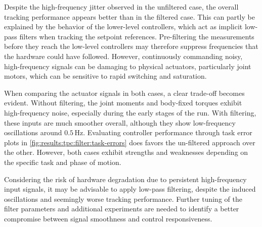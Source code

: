 Despite the high-frequency jitter observed in the unfiltered case, the overall tracking performance appears better than in the filtered case. This can partly be explained by the behavior of the lower-level controllers, which act as implicit low-pass filters when tracking the setpoint references. Pre-filtering the measurements before they reach the low-level controllers may therefore suppress frequencies that the hardware could have followed. However, continuously commanding noisy, high-frequency signals can be damaging to physical actuators, particularly joint motors, which can be sensitive to rapid switching and saturation.

When comparing the actuator signals in both cases, a clear trade-off becomes evident. Without filtering, the joint moments and body-fixed torques exhibit high-frequency noise, especially during the early stages of the run. With filtering, these inputs are much smoother overall, although they show low-frequency oscillations around \(0.5\,\mathrm{Hz}\). Evaluating controller performance through task error plots in \autoref{fig:results:tpc:filter:task-errors} does favors the un-filtered approach over the other. However, both cases exhibit strengths and weaknesses depending on the specific task and phase of motion.

Considering the risk of hardware degradation due to persistent high-frequency input signals, it may be advisable to apply low-pass filtering, despite the induced oscillations and seemingly worse tracking performance. Further tuning of the filter parameters and additional experiments are needed to identify a better compromise between signal smoothness and control responsiveness.






